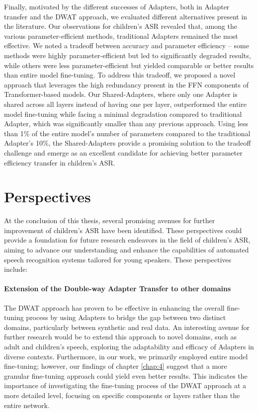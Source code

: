 Finally, motivated by the different successes of Adapters, both in Adapter transfer and the \ac{DWAT} approach, we evaluated different alternatives present in the literature. Our observations for children's \ac{ASR} revealed that, among the various parameter-efficient methods, traditional Adapters remained the most effective. We noted a tradeoff between accuracy and parameter efficiency – some methods were highly parameter-efficient but led to significantly degraded results, while others were less parameter-efficient but yielded comparable or better results than entire model fine-tuning. To address this tradeoff, we proposed a novel approach that leverages the high redundancy present in the \ac{FFN} components of Transformer-based models. Our Shared-Adapters, where only one Adapter is shared across all layers instead of having one per layer, outperformed the entire model fine-tuning while facing a minimal degradation compared to traditional Adapter, which was significantly smaller than any previous approach. Using less than 1\% of the entire model's number of parameters compared to the traditional Adapter's 10\%, the Shared-Adapters provide a promising solution to the tradeoff challenge and emerge as an excellent candidate for achieving better parameter efficiency transfer in children's \ac{ASR}.

\section{Perspectives}
At the conclusion of this thesis, several promising avenues for further improvement of children's \ac{ASR} have been identified. These perspectives could provide a foundation for future research endeavors in the field of children's \ac{ASR}, aiming to advance our understanding and enhance the capabilities of automated speech recognition systems tailored for young speakers. These perspectives include:

\paragraph*{Extension of the Double-way Adapter Transfer to other domains} The DWAT approach has proven to be effective in enhancing the overall fine-tuning process by using Adapters to bridge the gap between two distinct domains, particularly between synthetic and real data. An interesting avenue for further research would be to extend this approach to novel domains, such as adult and children's speech, exploring the adaptability and efficacy of Adapters in diverse contexts. Furthermore, in our work, we primarily employed entire model fine-tuning; however, our findings of chapter \ref{chap:4} suggest that a more granular fine-tuning approach could yield even better results. This indicates the importance of investigating the fine-tuning process of the DWAT approach at a more detailed level, focusing on specific components or layers rather than the entire network. 

